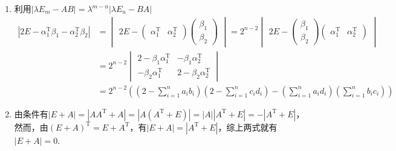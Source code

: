 \begin{enumerate}
    \item 利用$|\lambda E_m-AB|=\lambda^{m-n}|\lambda E_n-BA|$
          \begin{align*}
              |2E-\alpha_1^\mathrm{T}\beta_1-\alpha_2^\mathrm{T}\beta_2|
               & =\begin{vmatrix}
                      2E-\begin{pmatrix}
                         \alpha_1^\mathrm{T} & \alpha_2^\mathrm{T}
                     \end{pmatrix}\begin{pmatrix}
                                      \beta_1 \\\beta_2
                                  \end{pmatrix}
                  \end{vmatrix}
              =2^{n-2}\begin{vmatrix}
                          2E-\begin{pmatrix}
                         \beta_1 \\\beta_2
                     \end{pmatrix}\begin{pmatrix}
                                      \alpha_1^\mathrm{T} & \alpha_2^\mathrm{T}
                                  \end{pmatrix}
                      \end{vmatrix}         \\
               & =2^{n-2}\begin{vmatrix}
                             2-\beta_1\alpha_1^\mathrm{T} & -\beta_1\alpha_2^\mathrm{T}  \\
                             -\beta_2\alpha_1^\mathrm{T}  & 2-\beta_2\alpha_2^\mathrm{T}
                         \end{vmatrix} \\
               & =2^{n-2}
              \left(\left(2-\sum_{i=1}^na_ib_i\right)
              \left(2-\sum_{i=1}^nc_id_i\right)
              -\left(\sum_{i=1}^na_id_i\right)
              \left(\sum_{i=1}^nb_ic_i\right)\right)
          \end{align*}

    \item 由条件有$|E+A|=|AA^\mathrm{T}+A|=|A(A^\mathrm{T}+E)|=|A||A^\mathrm{T}+E|=-|A^\mathrm{T}+E|$，然而，由$(E+A)^\mathrm{T}=E+A^\mathrm{T}$，有$|E+A|=|A^\mathrm{T}+E|$，综上两式就有$|E+A|=0$.
\end{enumerate}

\clearpage
